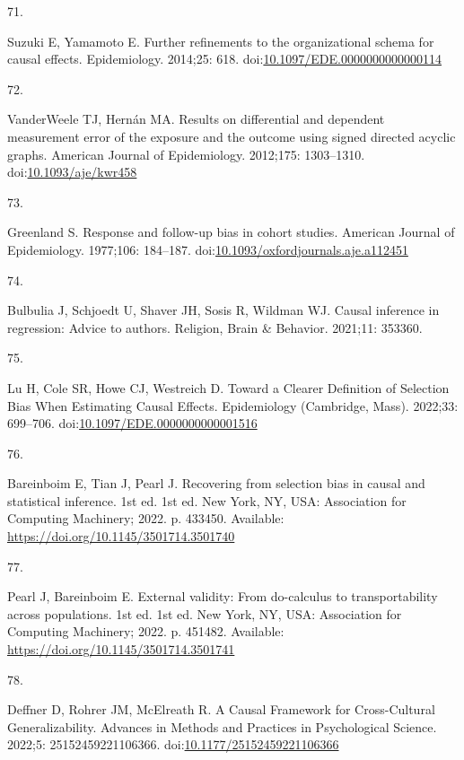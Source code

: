 \documentclass[
  singlecolumn]{article}
\newlength{\cslhangindent}
\newlength{\csllabelwidth}
\newlength{\cslentryspacingunit} %
\newenvironment{CSLReferences}[2] %
 {%
  \setlength{\parindent}{0pt}
  \ifodd #1
  \let\oldpar\par
  \def\par{\hangindent=\cslhangindent\oldpar}
  \fi
  \setlength{\parskip}{#2\cslentryspacingunit}
 }%
 {}
\newcommand{\CSLLeftMargin}[1]{\parbox[t]{\csllabelwidth}{#1}}
\newcommand{\CSLRightInline}[1]{\parbox[t]{\linewidth - \csllabelwidth}{#1}\break}
\begin{document}
\begin{CSLReferences}{0}{0}
\leavevmode{}%
\CSLLeftMargin{71. }%
\CSLRightInline{Suzuki E, Yamamoto E. Further refinements to the
organizational schema for causal effects. Epidemiology. 2014;25: 618.
doi:\href{https://doi.org/10.1097/EDE.0000000000000114}{10.1097/EDE.0000000000000114}}

\leavevmode{}%
\CSLLeftMargin{72. }%
\CSLRightInline{VanderWeele TJ, Hernán MA. Results on differential and
dependent measurement error of the exposure and the outcome using signed
directed acyclic graphs. American Journal of Epidemiology. 2012;175:
1303--1310.
doi:\href{https://doi.org/10.1093/aje/kwr458}{10.1093/aje/kwr458}}

\leavevmode{}%
\CSLLeftMargin{73. }%
\CSLRightInline{Greenland S. Response and follow-up bias in cohort
studies. American Journal of Epidemiology. 1977;106: 184--187.
doi:\href{https://doi.org/10.1093/oxfordjournals.aje.a112451}{10.1093/oxfordjournals.aje.a112451}}

\leavevmode{}%
\CSLLeftMargin{74. }%
\CSLRightInline{Bulbulia J, Schjoedt U, Shaver JH, Sosis R, Wildman WJ.
Causal inference in regression: Advice to authors. Religion, Brain \&
Behavior. 2021;11: 353360. }

\leavevmode{}%
\CSLLeftMargin{75. }%
\CSLRightInline{Lu H, Cole SR, Howe CJ, Westreich D. Toward a Clearer
Definition of Selection Bias When Estimating Causal Effects.
Epidemiology (Cambridge, Mass). 2022;33: 699--706.
doi:\href{https://doi.org/10.1097/EDE.0000000000001516}{10.1097/EDE.0000000000001516}}

\leavevmode{}%
\CSLLeftMargin{76. }%
\CSLRightInline{Bareinboim E, Tian J, Pearl J. Recovering from selection
bias in causal and statistical inference. 1st ed. 1st ed. New York, NY,
USA: Association for Computing Machinery; 2022. p. 433450. Available:
\url{https://doi.org/10.1145/3501714.3501740}}

\leavevmode{}%
\CSLLeftMargin{77. }%
\CSLRightInline{Pearl J, Bareinboim E. External validity: From
do-calculus to transportability across populations. 1st ed. 1st ed. New
York, NY, USA: Association for Computing Machinery; 2022. p. 451482.
Available: \url{https://doi.org/10.1145/3501714.3501741}}

\leavevmode{}%
\CSLLeftMargin{78. }%
\CSLRightInline{Deffner D, Rohrer JM, McElreath R. A Causal Framework
for Cross-Cultural Generalizability. Advances in Methods and Practices
in Psychological Science. 2022;5: 25152459221106366.
doi:\href{https://doi.org/10.1177/25152459221106366}{10.1177/25152459221106366}}


\end{CSLReferences}
\end{document}
